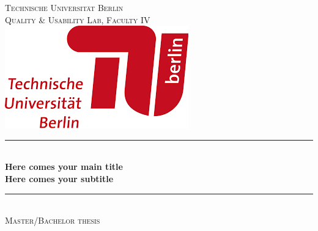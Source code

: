 \begin{titlepage}
\newcommand{\HRule}{\rule{\linewidth}{0.5mm}} %

\center %
 

\textsc{\LARGE Technische Universität Berlin}\\[0.5cm] 
\textsc{\large Quality \& Usability Lab, Faculty IV}\\[0.5cm] %

\includegraphics[scale=0.5]{tub_logo.png}\\

\vspace{1cm}

\HRule \\[0.4cm]
{ \Large \bfseries Here comes your main title \vspace{0.5cm} \\
\normalsize Here comes your subtitle}\\[0.3cm] %

\HRule \\[1.5cm]
 
\textsc{\large Master/Bachelor thesis}\\[0.5cm] %
\vspace{2cm}


\end{titlepage}
